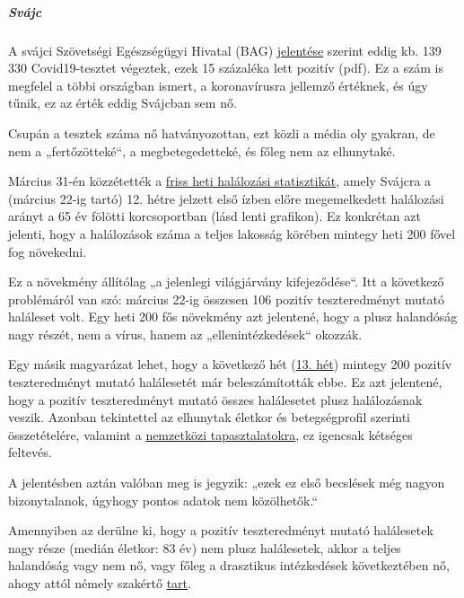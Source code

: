 \hypertarget{svuxe1jc}{%
\subparagraph{\texorpdfstring{\textbf{Svájc}}{Svájc}}\label{svuxe1jc}}

A svájci Szövetségi Egészségügyi Hivatal (BAG)
\href{https://www.bag.admin.ch/bag/de/home/krankheiten/ausbrueche-epidemien-pandemien/aktuelle-ausbrueche-epidemien/novel-cov/situation-schweiz-und-international.html}{jelentése}
szerint eddig kb. 139 330 Covid19-tesztet végeztek, ezek 15 százaléka
lett pozitív (pdf). Ez a szám is megfelel a többi országban ismert, a
koronavírusra jellemző értéknek, és úgy tűnik, ez az érték eddig
Svájcban sem nő.

Csupán a tesztek száma nő hatványozottan, ezt közli a média oly gyakran,
de nem a „fertőzötteké``, a megbetegedetteké, és főleg nem az
elhunytaké.

Március 31-én közzétették a
\href{https://www.bfs.admin.ch/bfs/de/home/statistiken/gesundheit/gesundheitszustand/sterblichkeit-todesursachen.html}{friss
heti halálozási statisztikát}, amely Svájcra a (március 22-ig tartó) 12.
hétre jelzett első ízben előre megemelkedett halálozási arányt a 65 év
fölötti korcsoportban (lásd lenti grafikon). Ez konkrétan azt jelenti,
hogy a halálozások száma a teljes lakosság körében mintegy heti 200
fővel fog növekedni.

Ez a növekmény állítólag „a jelenlegi világjárvány kifejeződése``. Itt a
következő problémáról van szó: március 22-ig összesen 106 pozitív
teszteredményt mutató haláleset volt. Egy heti 200 fős növekmény azt
jelentené, hogy a plusz halandóság nagy részét, nem a vírus, hanem az
„ellenintézkedések`` okozzák.

Egy másik magyarázat lehet, hogy a következő hét
(\href{https://de.wikipedia.org/wiki/COVID-19-Pandemie_in_der_Schweiz\#Todesf\%C3\%A4lle}{13.
hét}) mintegy 200 pozitív teszteredményt mutató halálesetét már
beleszámították ebbe. Ez azt jelentené, hogy a pozitív teszteredményt
mutató összes halálesetet plusz halálozásnak veszik. Azonban tekintettel
az elhunytak életkor és betegségprofil szerinti összetételére, valamint
a
\href{https://swprs.org/rki-relativiert-corona-todesfaelle/}{nemzetközi
tapasztalatokra}, ez igencsak kétséges feltevés.

A jelentésben aztán valóban meg is jegyzik: „ezek ez első becslések még
nagyon bizonytalanok, úgyhogy pontos adatok nem közölhetők.``

Amennyiben az derülne ki, hogy a pozitív teszteredményt mutató
halálesetek nagy része (medián életkor: 83 év) nem plusz halálesetek,
akkor a teljes halandóság vagy nem nő, vagy főleg a drasztikus
intézkedések következtében nő, ahogy attól némely szakértő
\href{https://swprs.org/offener-brief-von-professor-sucharit-bhakdi-an-bundeskanzlerin-dr-angela-merkel/}{tart}.

